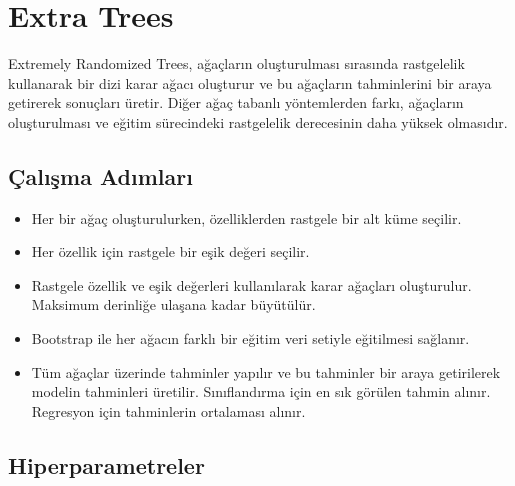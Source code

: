 \section{Extra Trees}
Extremely Randomized Trees, ağaçların oluşturulması sırasında rastgelelik kullanarak bir dizi karar ağacı oluşturur ve bu ağaçların tahminlerini bir araya getirerek sonuçları üretir. Diğer ağaç tabanlı yöntemlerden farkı, ağaçların oluşturulması ve eğitim sürecindeki rastgelelik derecesinin daha yüksek olmasıdır.

\subsection{Çalışma Adımları}
\begin{itemize}
    \item Her bir ağaç oluşturulurken, özelliklerden rastgele bir alt küme seçilir.
    \item Her özellik için rastgele bir eşik değeri seçilir.
    \item Rastgele özellik ve eşik değerleri kullanılarak karar ağaçları oluşturulur. Maksimum derinliğe ulaşana kadar büyütülür.
    \item Bootstrap ile her ağacın farklı bir eğitim veri setiyle eğitilmesi sağlanır.
    \item Tüm ağaçlar üzerinde tahminler yapılır ve bu tahminler bir araya getirilerek modelin tahminleri üretilir. Sınıflandırma için en sık görülen tahmin alınır. Regresyon için tahminlerin ortalaması alınır.
\end{itemize}

\subsection{Hiperparametreler}
\begin{table}[h]
\centering
{\scriptsize\renewcommand{\arraystretch}{0.4}
{}}
\end{table}

\newpage